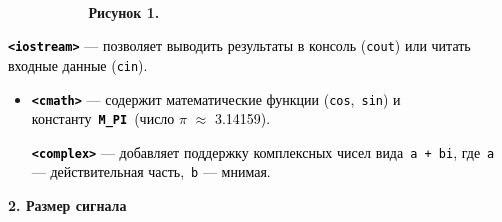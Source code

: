 \documentclass[a4paper]{article}
\newcommand\textstyleStrongEmphasis[1]{\textbf{#1}}
\newcommand\textstyleSourceText[1]{\texttt{#1}}
\newcommand\textstyleBulletSymbols[1]{\textrm{#1}}
\begin{document}
\bigskip


\bigskip


\bigskip

{\bfseries
\ \ \ \ \ \ \ \ \ \ \ \ \ \ \ \ \ \ \ \ \ \ \ \ \ \ \ \ \ \ \ \ \ \ \ \ \ \ \ \ \ \ \ \ \ \ \ \ \ \ \ \ \ \ \ \ \ \ \ \ \ \ \ \ \ \ \ \ \ \ \ \ \textmd{Рисунок
1.}}

{\color[HTML]{E45649}
\textstyleStrongEmphasis{\textstyleSourceText{\textrm{\textcolor{black}{{\textless}iostream{\textgreater}}}}}\textcolor{black}{
— позволяет выводить результаты в консоль (}\textstyleSourceText{\textrm{\textcolor{black}{cout}}}\textcolor{black}{)
или читать входные данные (}\textstyleSourceText{\textrm{\textcolor{black}{cin}}}\textcolor{black}{).}}


\bigskip

\begin{itemize}[series=listLi,label=\textstyleBulletSymbols{•}]
\item[]
\textstyleStrongEmphasis{\textstyleSourceText{\textrm{\textmd{\textcolor{black}{{\textless}}}}\textrm{\textcolor{black}{cmath}}\textrm{\textmd{\textcolor{black}{{\textgreater}}}}}}\textcolor{black}{
— содержит математические функции
(}\textstyleSourceText{\textrm{\textcolor{black}{cos}}}\textcolor{black}{, }\textstyleSourceText{\textrm{\textcolor{black}{sin}}}\textcolor{black}{)
и
константу }\textstyleStrongEmphasis{\textstyleSourceText{\textrm{\textmd{\textcolor{black}{M\_PI}}}}}\textcolor{black}{ (число
$\pi $ ${\approx}$ 3.14159).}


\bigskip

\textstyleStrongEmphasis{\textstyleSourceText{\textrm{\textmd{\textcolor{black}{{\textless}}}}\textrm{\textcolor{black}{complex}}\textrm{\textmd{\textcolor{black}{{\textgreater}}}}}}\textcolor{black}{
— добавляет поддержку комплексных чисел вида }\textstyleSourceText{\textrm{\textcolor{black}{a +
bi}}}\textcolor{black}{, где }\textstyleSourceText{\textrm{\textcolor{black}{a}}}\textcolor{black}{ — действительная
часть, }\textstyleSourceText{\textrm{\textcolor{black}{b}}}\textcolor{black}{ — мнимая.}


\bigskip
\end{itemize}

\bigskip


\bigskip

\foreignlanguage{russian}{\textbf{2. Размер сигнала}}


\bigskip


\bigskip
\end{document}
